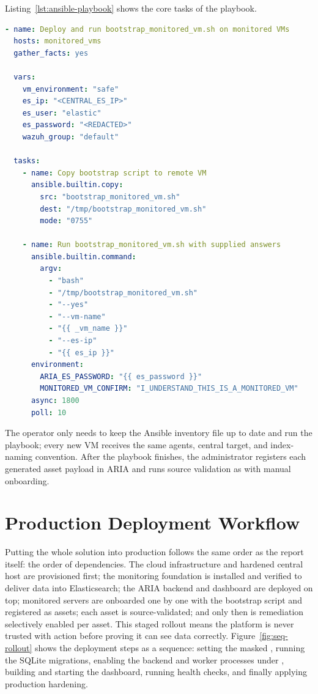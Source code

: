 Listing~\ref{lst:ansible-playbook} shows the core tasks of the playbook.

\begin{lstlisting}[style=aria,language=yaml,caption={Ansible playbook excerpt for monitored-VM deployment},label={lst:ansible-playbook},
  emph={hosts,vars,tasks,name,environment,ARIA_ES_PASSWORD,MONITORED_VM_CONFIRM,async,poll},
  emphstyle=\color{codekw}\bfseries]
- name: Deploy and run bootstrap_monitored_vm.sh on monitored VMs
  hosts: monitored_vms
  gather_facts: yes

  vars:
    vm_environment: "safe"
    es_ip: "<CENTRAL_ES_IP>"
    es_user: "elastic"
    es_password: "<REDACTED>"
    wazuh_group: "default"

  tasks:
    - name: Copy bootstrap script to remote VM
      ansible.builtin.copy:
        src: "bootstrap_monitored_vm.sh"
        dest: "/tmp/bootstrap_monitored_vm.sh"
        mode: "0755"

    - name: Run bootstrap_monitored_vm.sh with supplied answers
      ansible.builtin.command:
        argv:
          - "bash"
          - "/tmp/bootstrap_monitored_vm.sh"
          - "--yes"
          - "--vm-name"
          - "{{ _vm_name }}"
          - "--es-ip"
          - "{{ es_ip }}"
      environment:
        ARIA_ES_PASSWORD: "{{ es_password }}"
        MONITORED_VM_CONFIRM: "I_UNDERSTAND_THIS_IS_A_MONITORED_VM"
      async: 1800
      poll: 10
\end{lstlisting}

The operator only needs to keep the Ansible inventory file up to date and run the playbook; every new VM receives the same agents, central target, and index-naming convention. After the playbook finishes, the administrator registers each generated asset payload in ARIA and runs source validation as with manual onboarding.

\section{Production Deployment Workflow}

Putting the whole solution into production follows the same order as the report itself: the order of dependencies. The cloud infrastructure and hardened central host are provisioned first; the monitoring foundation is installed and verified to deliver data into Elasticsearch; the ARIA backend and dashboard are deployed on top; monitored servers are onboarded one by one with the bootstrap script and registered as assets; each asset is source-validated; and only then is remediation selectively enabled per asset. This staged rollout means the platform is never trusted with action before proving it can see data correctly. Figure~\ref{fig:seq-rollout} shows the deployment steps as a sequence: setting the masked , running the SQLite migrations, enabling the backend and worker processes under , building and starting the dashboard, running health checks, and finally applying production hardening.

